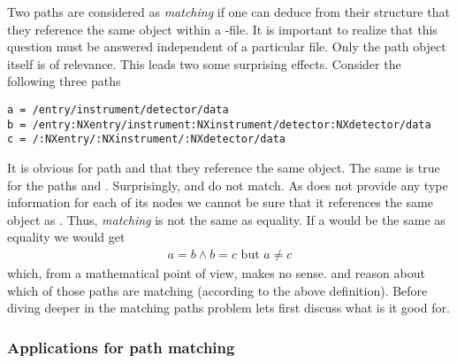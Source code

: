 Two paths are considered as \emph{matching} if one can deduce from their
structure that they reference the same object within a \nexus-file. 
It is important to realize that this question must be answered independent of a 
particular file. Only the path object itself is of relevance. This leads two some
surprising effects. Consider the following three paths
\begin{verbatim}
a = /entry/instrument/detector/data
b = /entry:NXentry/instrument:NXinstrument/detector:NXdetector/data
c = /:NXentry/:NXinstrument/:NXdetector/data
\end{verbatim}
It is obvious for path  and  that they reference the same object. 
The same is true for the paths  and . Surprisingly,  and
 do not match. As  does not provide any type information for each 
of its nodes we cannot be sure that it references the same object as . 
Thus, \emph{matching} is not the same as equality. If a  would be the
same as equality we would get
\begin{align}
    a = b \land b=c\mbox{ but } a\not= c
\end{align}
which, from a mathematical point of view, makes no sense.
and reason about which of those paths are matching (according to the above 
definition). Before diving deeper in the matching paths problem lets first
discuss what is it good for. 

\subsubsection{Applications for path matching}

